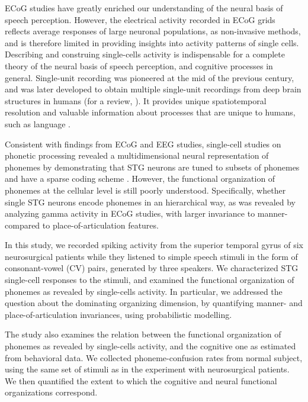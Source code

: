 ECoG studies have greatly enriched our understanding of the neural basis of speech perception.  However, the electrical activity recorded in ECoG grids reflects average responses of large neuronal populations, as non-invasive methods, and is therefore limited in providing insights into activity patterns of single cells. Describing and construing single-cells activity is indispensable for a complete theory of the neural basis of speech perception, and cognitive processes in general. Single-unit recording was pioneered at the mid of the previous century, and was later developed to obtain multiple single-unit recordings from deep brain structures in humans \citep{fried1999cerebral} (for a review, \citealp{engel2005invasive, mukamel2012human, cash2015emergence}). It provides unique spatiotemporal resolution and valuable information about processes that are unique to humans, such as language \citep{heit1988neural, ojemann1988neuronal, tankus2012structured, ossmy2015decoding}.

Consistent with findings from ECoG and EEG studies, single-cell studies on phonetic processing revealed a multidimensional neural representation of phonemes by demonstrating that STG neurons are tuned to subsets of phonemes and have a sparse coding scheme \citep{creutzfeldt1989neuronal, chan2013speech}. However, the functional organization of phonemes at the cellular level is still poorly understood. Specifically, whether single STG neurons encode phonemes in an hierarchical way, as was revealed by analyzing gamma activity in ECoG studies, with larger invariance to manner- compared to place-of-articulation features.

In this study, we recorded spiking activity from the superior temporal gyrus of six neurosurgical patients while they listened to simple speech stimuli in the form of consonant-vowel (CV) pairs, generated by three speakers. We characterized STG single-cell responses to the stimuli, and examined the functional organization of phonemes as revealed by single-cells activity. In particular, we addressed the question about the dominating organizing dimension, by quantifying manner- and place-of-articulation invariances, using probabilistic modelling.

The study also examines the relation between the functional organization of phonemes as revealed by single-cells activity, and the cognitive one as estimated from behavioral data. We collected phoneme-confusion rates from normal subject, using the same set of stimuli as in the experiment with neurosurgical patients. We then quantified the extent to which the cognitive and neural functional organizations correspond. 

